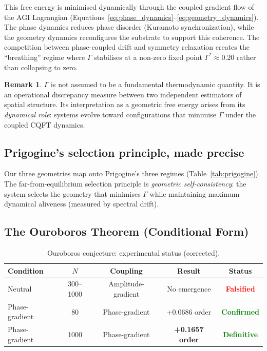 \documentclass[12pt,a4paper]{article}
\theoremstyle{plain}
\theoremstyle{definition}
\newtheorem{remark}[theorem]{Remark}
\begin{document}
This free energy is minimised dynamically through the coupled gradient
flow of the AGI Lagrangian
(Equations~\ref{eq:phase_dynamics}--\ref{eq:geometry_dynamics}).
The phase dynamics reduces phase disorder (Kuramoto synchronization),
while the geometry dynamics reconfigures the substrate to support this
coherence. The competition between phase-coupled drift and symmetry
relaxation creates the ``breathing'' regime where $\Gamma$ stabilises
at a non-zero fixed point $\Gamma^* \approx 0.20$ rather than collapsing
to zero.

\begin{remark}
$\Gamma$ is not assumed to be a fundamental thermodynamic quantity. It
is an operational discrepancy measure between two independent estimators
of spatial structure. Its interpretation as a geometric free energy
arises from its \emph{dynamical role}: systems evolve toward
configurations that minimise $\Gamma$ under the coupled CQFT dynamics.
\end{remark}

\subsection{Prigogine's selection principle, made precise}

Our three geometries map onto Prigogine's three regimes
(Table~\ref{tab:prigogine}). The far-from-equilibrium selection principle
is \emph{geometric self-consistency}: the system selects the geometry
that minimises $\Gamma$ while maintaining maximum dynamical aliveness
(measured by spectral drift).

\subsection{The Ouroboros Theorem (Conditional Form)}
\label{sec:ouroboros}

\begin{table}[H]
\centering
\caption{Ouroboros conjecture: experimental status (corrected).}
\label{tab:ouroboros_status}
\begin{tabular}{lcccc}
\toprule
\textbf{Condition} & $N$ & \textbf{Coupling} & \textbf{Result} &
  \textbf{Status} \\
\midrule
Neutral & 300--1000 & Amplitude-gradient & No emergence &
  \textcolor{red}{\textbf{Falsified}} \\
Phase-gradient & 80 & Phase-gradient & +0.0686 order &
  \textcolor{green}{\textbf{Confirmed}} \\
Phase-gradient & 1000 & Phase-gradient & \textbf{+0.1657 order} &
  \textcolor{green}{\textbf{Definitive}} \\
\bottomrule
\end{tabular}
\end{table}
\end{document}
